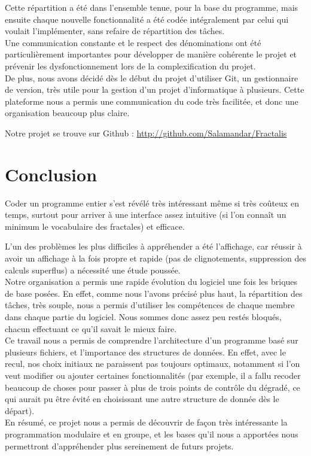\documentclass[a4paper,11pt]{article} \usepackage[T1]{fontenc} \usepackage[utf8]{inputenc} \usepackage[francais]{babel}
\begin{document}
Cette répartition a été dans l'ensemble tenue, pour la base du programme, mais ensuite chaque nouvelle fonctionnalité a été codée intégralement par celui qui voulait l'implémenter, sans refaire de répartition des tâches.\\

Une communication constante et le respect des dénominations ont été particulièrement importantes pour développer de manière cohérente le projet et prévenir les dysfonctionnement lors de la complexification du projet.\\

De plus, nous avons décidé dès le début du projet d'utiliser Git, un gestionnaire de version, très utile pour la gestion d'un projet d'informatique à plusieurs. Cette plateforme nous a permis une communication du code très facilitée, et donc une organisation beaucoup plus claire.

Notre projet se trouve sur Github : \url{http://github.com/Salamandar/Fractalis}



\section{Conclusion}
Coder un programme entier s'est révélé très intéressant même si très coûteux en temps, surtout pour arriver à une interface assez intuitive (si l'on connaît un minimum le vocabulaire des fractales) et efficace.

L'un des problèmes les plus difficiles à appréhender a été l'affichage, car réussir à avoir un affichage à la fois propre et rapide (pas de clignotements, suppression des calculs superflus) a nécessité une étude poussée.\\

Notre organisation a permis une rapide évolution du logiciel une fois les briques de base posées.
En effet, comme nous l'avons précisé plus haut, la répartition des tâches, très souple, nous a permis d'utiliser les compétences de chaque membre dans chaque partie du logiciel. Nous sommes donc assez peu restés bloqués, chacun effectuant ce qu'il savait le mieux faire.\\

Ce travail nous a permis de comprendre l'architecture d'un programme basé sur plusieurs fichiers, et l'importance des structures de données. En effet, avec le recul, nos choix initiaux ne paraissent pas toujours optimaux, notamment si l'on veut modifier ou ajouter certaines fonctionnalités (par exemple, il a fallu recoder beaucoup de choses pour passer à plus de trois points de contrôle du dégradé, ce qui aurait pu être évité en choisissant une autre structure de donnée dès le départ).\\

En résumé, ce projet nous a permis de découvrir de façon très intéressante la programmation modulaire et en groupe, et les bases qu'il nous a apportées nous permettront d'appréhender plus sereinement de futurs projets.
\end{document}
